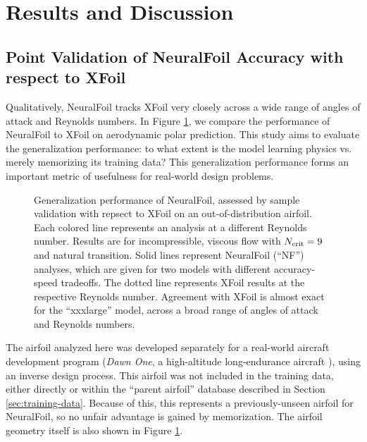 \documentclass[journal]{new-aiaa}
\begin{document}
\section{Results and Discussion}
\label{sec:results}

\subsection{Point Validation of NeuralFoil Accuracy with respect to XFoil}
\label{sec:validation_basic}

Qualitatively, NeuralFoil tracks XFoil very closely across a wide range of angles of attack and Reynolds numbers. In Figure \ref{fig:clcd_polar}, we compare the performance of NeuralFoil to XFoil on aerodynamic polar prediction. This study aims to evaluate the generalization performance: to what extent is the model learning physics vs. merely memorizing its training data? This generalization performance forms an important metric of usefulness for real-world design problems.

\begin{figure}[h]
    \centering
    
    \caption{Generalization performance of NeuralFoil, assessed by sample validation with repsect to XFoil on an out-of-distribution airfoil. Each colored line represents an analysis at a different Reynolds number. Results are for incompressible, viscous flow with $N_{\rm crit}=9$ and natural transition. Solid lines represent NeuralFoil (``NF'') analyses, which are given for two models with different accuracy-speed tradeoffs. The dotted line represents XFoil results at the respective Reynolds number. Agreement with XFoil is almost exact for the ``xxxlarge'' model, across a broad range of angles of attack and Reynolds numbers.}
    \label{fig:clcd_polar}
\end{figure}

The airfoil analyzed here was developed separately for a real-world aircraft development program (\emph{Dawn One}, a high-altitude long-endurance aircraft \cite{sharpeOptimizationApproachMapping2021,sharpeTaileronsAeroelasticStability2023}), using an inverse design process. This airfoil was not included in the training data, either directly or within the ``parent airfoil'' database described in Section \ref{sec:training-data}. Because of this, this represents a previously-unseen airfoil for NeuralFoil, so no unfair advantage is gained by memorization. The airfoil geometry itself is also shown in Figure \ref{fig:clcd_polar}.
\end{document}
